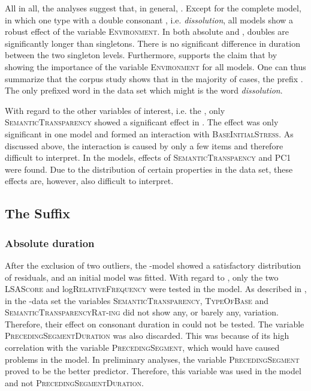 All in all, the analyses suggest that, in general,  . Except for the complete  model, in which one type with a double consonant , i.e. \textit{dissolution}, all  models show a robust effect of the variable \textsc{Environment}. In both absolute and , doubles are significantly longer than singletons. There is no significant difference in duration between the two singleton levels. Furthermore,  supports the claim that   by showing the importance of the variable \textsc{Environment} for all models. 
One can thus summarize that the corpus study shows that in the majority of cases, the prefix  . The only prefixed word in the data set which might  is the word \textit{dissolution}.

With regard to the other variables of interest, i.e. the , only \textsc{SemanticTransparency} showed a significant effect in . The effect was only significant in one model and formed an interaction with \textsc{BaseInitialStress}. As discussed above, the interaction is  caused by only a few items and therefore difficult to interpret.
 In the  models, effects of \textsc{SemanticTranspaency} and \textsc{PC1} were found. Due to the distribution of certain properties in the data set, these effects are, however, also difficult to interpret. 


\subsection{The Suffix }


\subsubsection{Absolute duration}

After the exclusion of two outliers, the -model showed a satisfactory distribution of residuals, and an initial model was fitted. 
With regard to , only the two  \textsc{LSAScore} and log\textsc{RelativeFrequency} were tested in the model. As described in , in the -data set the variables \textsc{SemanticTransparency}, \textsc{TypeOfBase}  and \textsc{SemanticTransparencyRat-ing} did not show any, or barely any, variation. Therefore, their effect on consonant duration in  could not be tested. The variable \textsc{PrecedingSegmentDuration} was also discarded. This was because of its high correlation with the variable \textsc{PrecedingSegment}, which would have caused  problems in the model. In preliminary analyses, the variable \textsc{PrecedingSegment} proved to be the better predictor. Therefore, this variable was used in the model and not \textsc{PrecedingSegmentDuration}. 

